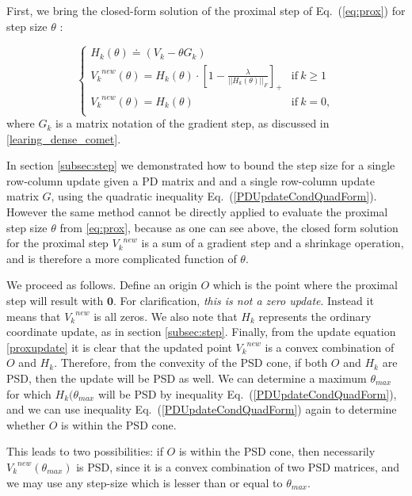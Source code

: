 \documentclass[twoside,11pt]{article}
\newcommand\mat[1]{{#1}}
\renewcommand\vec[1]{\mathbf{#1}}
\newcommand{\eqdef}{\doteq}
\newcommand{\Hk}{H_k}
\newcommand{\Vk}{\mat{V_k}}
\renewcommand{\eqref}[1]{Eq.~(\ref{#1})}
\begin{document}
First, we bring the closed-form solution of the proximal step of \eqref{eq:prox} for step size $\theta$ \citep{bach2012optimization}:

\begin{equation}\label{proxupdate}
 \begin{cases}
   H_k(\theta) \eqdef (V_k-\theta G_k) \\ 
   \Vk^{new} (\theta) = \Hk(\theta) \cdot [1 - \frac{\lambda}{||\Hk(\theta)||_F}]_+ & \text{if}\  k \geq 1\\
   \Vk^{new} (\theta) = \Hk(\theta) & \text{if}\ k = 0, \\ 
 \end{cases}
\end{equation}
where $G_k$ is a matrix notation of the gradient step, as discussed in \ref{learing_dense_comet}. 

In section \ref{subsec:step} we demonstrated how to bound the step size for a single row-column update given a PD matrix and and a single row-column update matrix $\mat{G}$, using the quadratic inequality \eqref{PDUpdateCondQuadForm}.
However the same method cannot be directly applied to evaluate the proximal step size $\theta$ from \ref{eq:prox}, because as one can see above, the closed form solution for the proximal step $\Vk^{new}$ is a sum of a gradient step and a shrinkage operation, and is therefore a more complicated function of $\theta$.

\newcommand{\Vkorigin}{\mat{O}}
We proceed as follows. Define an origin $\Vkorigin$ which is the point where the proximal step will result with $\vec{0}$. For clarification, \emph{this is not a zero update}. Instead it means that $\Vk^{new}$ is all zeros. We also note that $\Hk$ represents the ordinary coordinate update, as in section \ref{subsec:step}. Finally, from the update equation \ref{proxupdate} it is clear that the updated point $\Vk^{new}$ is a convex combination of $\Vkorigin$ and $\Hk$. Therefore, from the convexity of the PSD cone, if both $\Vkorigin$ and $\Hk$ are PSD, then the update will be PSD as well. We can determine a maximum $\theta_{max}$ for which $\Hk(\theta_{max}$ will be PSD by inequality \eqref{PDUpdateCondQuadForm}, and we can use inequality \eqref{PDUpdateCondQuadForm} again to determine whether $\Vkorigin$ is within the PSD cone.

This leads to two possibilities: if $\Vkorigin$ is within the PSD cone, then necessarily $\Vk^{new} (\theta_{max})$ is PSD, since it is a convex combination of two PSD matrices, and we may use any step-size which is lesser than or equal to $\theta_{max}$.
\end{document}
